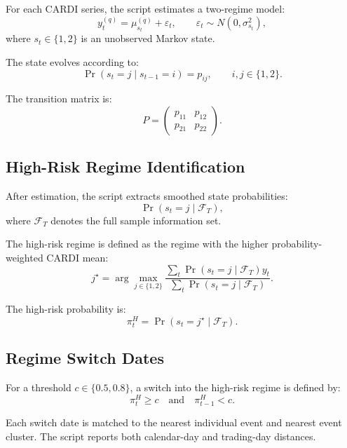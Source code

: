 \documentclass[11pt]{article}
\begin{document}
For each CARDI series, the script estimates a two-regime model:
\begin{equation}
y_t^{(q)}
=
\mu_{s_t}^{(q)} + \varepsilon_t,
\qquad
\varepsilon_t \sim N\left(0,\sigma_{s_t}^2\right),
\end{equation}
where \(s_t \in \{1,2\}\) is an unobserved Markov state.

The state evolves according to:
\begin{equation}
\Pr(s_t=j \mid s_{t-1}=i)
=
p_{ij},
\qquad i,j \in \{1,2\}.
\end{equation}

The transition matrix is:
\begin{equation}
P =
\begin{pmatrix}
p_{11} & p_{12}\\
p_{21} & p_{22}
\end{pmatrix}.
\end{equation}

\subsection{High-Risk Regime Identification}

After estimation, the script extracts smoothed state probabilities:
\[
\Pr(s_t=j \mid \mathcal{F}_T),
\]
where \(\mathcal{F}_T\) denotes the full sample information set.

The high-risk regime is defined as the regime with the higher
probability-weighted CARDI mean:
\begin{equation}
j^\star
=
\arg\max_{j \in \{1,2\}}
\frac{\sum_t \Pr(s_t=j \mid \mathcal{F}_T) y_t}
{\sum_t \Pr(s_t=j \mid \mathcal{F}_T)}.
\end{equation}

The high-risk probability is:
\begin{equation}
\pi_t^{H}
=
\Pr(s_t=j^\star \mid \mathcal{F}_T).
\end{equation}

\subsection{Regime Switch Dates}

For a threshold \(c \in \{0.5,0.8\}\), a switch into the high-risk regime is
defined by:
\begin{equation}
\pi_t^H \geq c
\quad \text{and} \quad
\pi_{t-1}^H < c.
\end{equation}

Each switch date is matched to the nearest individual event and nearest event
cluster. The script reports both calendar-day and trading-day distances.
\end{document}
